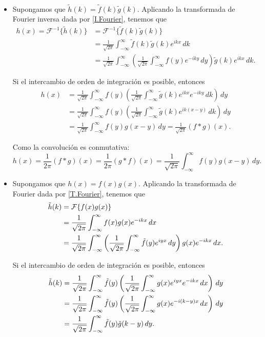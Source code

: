 \begin{demo}
\ 

\begin{itemize}
    \item Supongamos que  $\tilde{h}(k) = \tilde{f}(k) \tilde{g}(k)$. Aplicando la transformada de Fourier inversa dada por \eqref{I.Fourier}, tenemos que 
\begin{align*}
   h(x) = \mathcal{F}^{-1} \{\tilde{h}(k)\} & = \mathcal{F}^{-1} \{\tilde{f}(k) \tilde{g}(k)\} \\
   & = \frac{1}{\sqrt{2\pi}} \int_{-\infty}^{\infty} \tilde{f}(k) \tilde{g}(k) e^{ikx} \,dk \\
   & = \frac{1}{\sqrt{2\pi}} \int_{-\infty}^{\infty}  \left( \frac{1}{\sqrt{2\pi}} \int_{-\infty}^{\infty} f(y) e^{-ik y} \,dy \right) \tilde{g}(k)  e^{ikx}  \,dk.
\end{align*}

Si el intercambio de orden de integración es posible, entonces 
\begin{align*}
  h(x) &= \frac{1}{\sqrt{2\pi}} \int_{-\infty}^{\infty}  f(y)  \left( \frac{1}{\sqrt{2\pi}} \int_{-\infty}^{\infty}  \tilde{g}(k)  e^{ikx} e^{-ik y}\,d k \right) \,dy \\
   & = \frac{1}{\sqrt{2\pi}} \int_{-\infty}^{\infty}  f(y)  \left( \frac{1}{\sqrt{2\pi}} \int_{-\infty}^{\infty}  \tilde{g}(k)  e^{ik(x-y)}\,d k \right) \,dy \\
   & = \frac{1}{\sqrt{2\pi}} \int_{-\infty}^{\infty}  f(y) g(x-y) \,dy = \frac{1}{\sqrt{2\pi}} (f * g)(x).
\end{align*}

Como la convolución es conmutativa:
$$h(x) = \frac{1}{2\pi} (f * g)(x) = \frac{1}{2\pi} (g * f)(x)  = \frac{1}{\sqrt{2\pi}} \int_{-\infty}^{\infty}  f(y) g(x-y) \,dy.$$

\item  Supongamos que $h(x) = f(x) g(x)$. Aplicando la transformada de Fourier dada por \eqref{T.Fourier}, tenemos que 
\begin{align*}
   \Tilde{h}(k) &=  \mathcal{F} \{f(x) g(x)\} \\
   &= \frac{1}{\sqrt{2\pi}} \int_{-\infty}^{\infty} f(x) g(x) e^{-ikx} \,dx \\
   &=  \frac{1}{\sqrt{2\pi}} \int_{-\infty}^{\infty} \left( \frac{1}{\sqrt{2\pi}} \int_{-\infty}^{\infty} \Tilde{f}(y) e^{iyx} \,dy \right) g(x) e^{-ikx} \,dx.
\end{align*}

Si el intercambio de orden de integración es posible, entonces 
\begin{align*}
   \Tilde{h}(k) &=  \frac{1}{\sqrt{2\pi}} \int_{-\infty}^{\infty} \Tilde{f}(y) \left( \frac{1}{\sqrt{2\pi}} \int_{-\infty}^{\infty} g(x) e^{iyx}  e^{-ikx}\,dx \right) \,dy \\
   &=  \frac{1}{\sqrt{2\pi}} \int_{-\infty}^{\infty} \Tilde{f}(y) \left( \frac{1}{\sqrt{2\pi}} \int_{-\infty}^{\infty} g(x) e^{-i(k-y)x} \,dx \right) \,dy \\
   &=  \frac{1}{\sqrt{2\pi}} \int_{-\infty}^{\infty} \Tilde{f}(y) \Tilde{g}(k-y) \,dy. 
\end{align*}


\end{itemize}
\end{demo}
